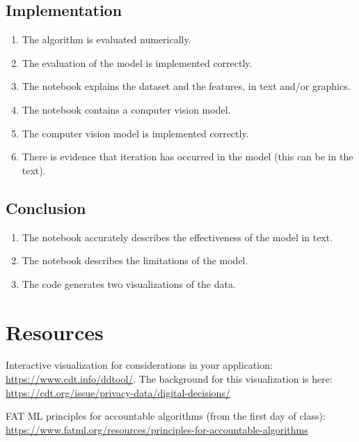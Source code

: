 \documentclass{tufte-handout}
\begin{document}
\subsection{Implementation}
\begin{enumerate}[resume]
\item The algorithm is evaluated numerically.
\item The evaluation of the model is implemented correctly.
\item The notebook explains the dataset and the features, in text and/or graphics.
\item The notebook contains a computer vision model.
\item The computer vision model is implemented correctly.
\item There is evidence that iteration has occurred in the model (this can be in the text).
\end{enumerate}

\subsection{Conclusion}
\begin{enumerate}[resume]
\item The notebook accurately describes the effectiveness of the model in text.
\item The notebook describes the limitations of the model.
\item The code generates two visualizations of the data.
\end{enumerate}


\section*{Resources}
\bi
\item Interactive visualization for considerations in your application: \href{https://www.cdt.info/ddtool/}{https://www.cdt.info/ddtool/}. The background for this visualization is here: \href{https://cdt.org/issue/privacy-data/digital-decisions/} {https://cdt.org/issue/privacy-data/digital-decisions/} 
\item FAT ML principles for accountable algorithms (from the first day of class): \href{https://www.fatml.org/resources/principles-for-accountable-algorithms}{https://www.fatml.org/resources/principles-for-accountable-algorithms}
\ei
\end{document}
